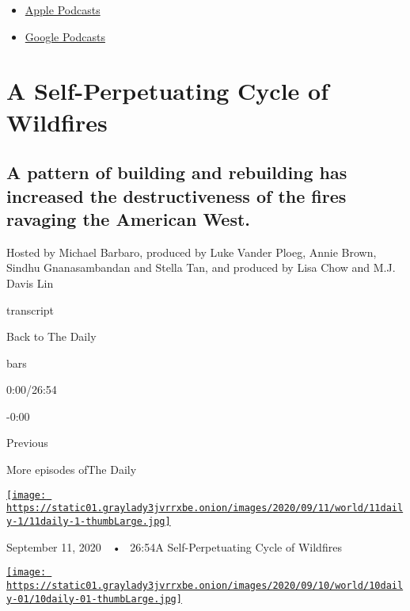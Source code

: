 \begin{itemize}
\tightlist
\item
  \href{https://itunes.apple.com/us/podcast/id1200361736}{Apple
  Podcasts}
\item
  \href{https://www.google.com/podcasts?feed=aHR0cHM6Ly9yc3MuYXJ0MTkuY29tL3RoZS1kYWlseQ\%3D\%3D}{Google
  Podcasts}
\end{itemize}

\hypertarget{a-self-perpetuating-cycle-of-wildfires}{%
\section{A Self-Perpetuating Cycle of
Wildfires}\label{a-self-perpetuating-cycle-of-wildfires}}

\hypertarget{a-pattern-of-building-and-rebuilding-has-increased-the-destructiveness-of-the-fires-ravaging-the-american-west}{%
\subsection{A pattern of building and rebuilding has increased the
destructiveness of the fires ravaging the American
West.}\label{a-pattern-of-building-and-rebuilding-has-increased-the-destructiveness-of-the-fires-ravaging-the-american-west}}

Hosted by Michael Barbaro, produced by Luke Vander Ploeg, Annie Brown,
Sindhu Gnanasambandan and Stella Tan, and produced by Lisa Chow and M.J.
Davis Lin

transcript

Back to The Daily

bars

0:00/26:54

-0:00

Previous

More episodes ofThe Daily

\href{https://www.nytimes3xbfgragh.onion/2020/09/11/podcasts/the-daily/wildfires-california-fire-zones.html?action=click\&module=audio-series-bar\&region=header\&pgtype=Article}{\texttt{[image: https://static01.graylady3jvrrxbe.onion/images/2020/09/11/world/11daily-1/11daily-1-thumbLarge.jpg]}}

September 11, 2020~~•~ 26:54A Self-Perpetuating Cycle of Wildfires

\href{https://www.nytimes3xbfgragh.onion/2020/09/10/podcasts/the-daily/Breonna-Taylor.html?action=click\&module=audio-series-bar\&region=header\&pgtype=Article}{\texttt{[image: https://static01.graylady3jvrrxbe.onion/images/2020/09/10/world/10daily-01/10daily-01-thumbLarge.jpg]}}

